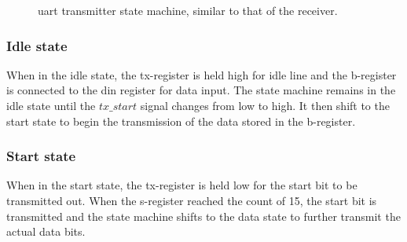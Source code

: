 \documentclass[main.tex]{subfiles}
\begin{document}
\begin{figure}[!htp]
\begin{center}
\caption{\gls{uart} transmitter state machine, similar to that of the receiver.}
\label{fig:uarttx}
\end{center}
\end{figure}

\subsubsection{Idle state}
When in the idle state, the tx-register is held high for idle line and the b-register is connected to the din register for data input. The state machine remains in the idle state until the $tx\_start$ signal changes from low to high. It then shift to the start state to begin the transmission of the data stored in the b-register. 

\subsubsection{Start state}
When in the start state, the tx-register is held low for the start bit to be transmitted out. When the s-register reached the count of 15, the start bit is transmitted and the state machine shifts to the data state to further transmit the actual data bits.
\end{document}
